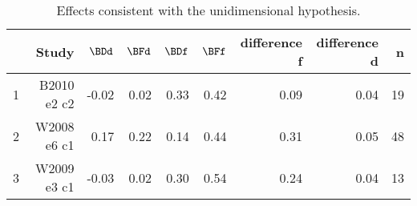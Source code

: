 \begin{table}[ht]
\centering
\begin{tabular}{rrrrrrrrr}
  \hline
 & Study & $\BDd$ & $\BFd$ & $\BDf$ & $\BFf$ & difference f & difference d & n \\ 
  \hline
1 & B2010   e2 c2 & -0.02 & 0.02 & 0.33 & 0.42 & 0.09 & 0.04 &  19 \\ 
  2 & W2008   e6 c1 & 0.17 & 0.22 & 0.14 & 0.44 & 0.31 & 0.05 &  48 \\ 
  3 & W2009   e3 c1 & -0.03 & 0.02 & 0.30 & 0.54 & 0.24 & 0.04 &  13 \\ 
   \hline
\end{tabular}
\caption{\label{tab:consistentEffects}Effects consistent with the unidimensional hypothesis.} 
\label{tab:consistentEffects}
\end{table}
